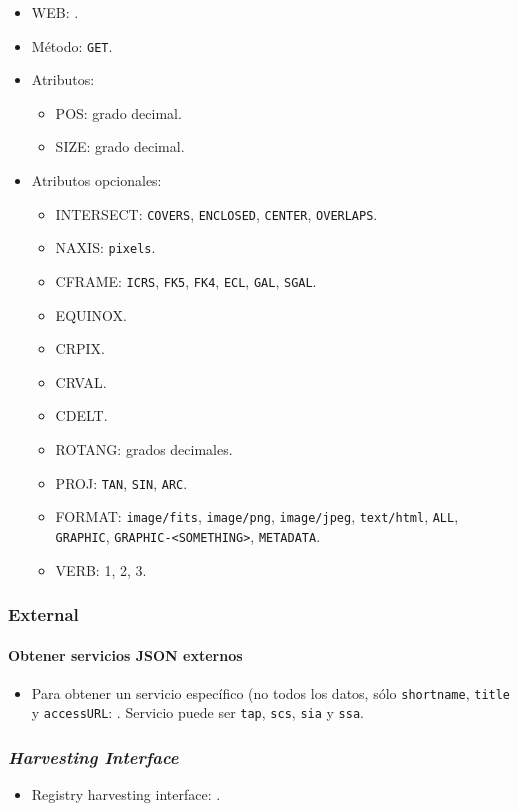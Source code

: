 \begin{itemize}
	\item WEB: \url{}.
	\item M\'etodo: \verb;GET;.
	\item Atributos: 
		\begin{itemize}
			\item POS: grado decimal.
			\item SIZE: grado decimal.
		\end{itemize}
	\item Atributos opcionales:
		\begin{itemize}
			\item INTERSECT: \verb;COVERS;, \verb;ENCLOSED;, \verb;CENTER;, \verb;OVERLAPS;.
			\item NAXIS: \verb;pixels;.
			\item CFRAME: \verb;ICRS;, \verb;FK5;, \verb;FK4;, \verb;ECL;, \verb;GAL;, \verb;SGAL;.
			\item EQUINOX.
			\item CRPIX.
			\item CRVAL.
			\item CDELT.
			\item ROTANG: grados decimales.
			\item PROJ: \verb;TAN;, \verb;SIN;, \verb;ARC;.
			\item FORMAT: \verb;image/fits;, \verb;image/png;, \verb;image/jpeg;, \verb;text/html;, \verb;ALL;, \verb;GRAPHIC;, \verb;GRAPHIC-<SOMETHING>;, \verb;METADATA;.
			\item VERB: 1, 2, 3.
		\end{itemize}
\end{itemize}

\subsubsection*{{\sc External}} 

\paragraph{Obtener servicios JSON externos}

\begin{itemize}
	\item Para obtener un servicio específico (no todos los datos, sólo \verb;shortname;, \verb;title; y \verb;accessURL;: \url{}. Servicio puede ser \verb;tap;, \verb;scs;, \verb;sia; y \verb;ssa;.
\end{itemize}

\subsubsection*{\emph{Harvesting Interface}}

\begin{itemize}
	\item Registry harvesting interface: \url{}.
\end{itemize}
